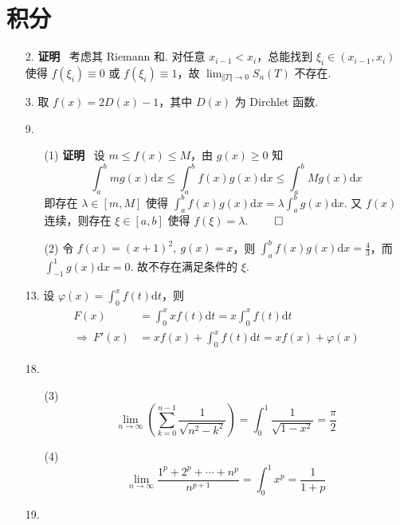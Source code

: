 \documentclass[11pt,oneside,fontset=fandol]{ctexbook} %
\renewcommand\theenumi{\thesection.\arabic{enumi}}
\begin{document}
\section{积分}
\label{sec:5.1}

\begin{enumerate}[label=\theenumi]
    \item[2.]
    \textbf{证明} \ 考虑其 Riemann 和. 对任意 $x_{i-1} < x_i$，总能找到 $\xi_i \in (x_{i-1}, x_i)$ 使得 $f(\xi_i) \equiv 0$ 或 $f(\xi_i) \equiv 1$，故 $\lim_{\Vert T \Vert \to 0} S_n(T)$ 不存在.
    \item[3.]
    取 $f(x) = 2D(x) - 1$，其中 $D(x)$ 为 Dirchlet 函数.
    \item[9.]
    \begin{enumerate}
        \item[(1)]
        \textbf{证明} \ 设 $m \leqslant f(x) \leqslant M$，由 $g(x) \geqslant 0$ 知
        \[
            \int_a^b m g(x) \mathrm dx \leqslant \int_a^b f(x)g(x) \mathrm dx \leqslant \int_a^b M g(x) \mathrm dx
        \]
        即存在 $\lambda \in [m, M]$ 使得 $\int_a^b f(x)g(x) \mathrm dx = \lambda \int_a^b g(x) \mathrm dx$. 又 $f(x)$ 连续，则存在 $\xi \in [a, b]$ 使得 $f(\xi) = \lambda$.
        $\hfill\qed$
        \item[(2)]
        令 $f(x) = (x+1)^2,\ g(x) = x$，则 $\int_a^b f(x)g(x) \mathrm dx = \frac 4 3$，而 $\int_{-1}^1 g(x) \mathrm dx = 0$. 故不存在满足条件的 $\xi$.
    \end{enumerate}
    \item[13.]
    设 $\varphi(x) = \int_0^x f(t) \mathrm dt$，则
    \begin{align*}
        F(x) &= \int_0^x x f(t) \mathrm dt = x \int_0^x f(t) \mathrm dt \\ 
        \Rightarrow \ F'(x) &= x f(x) + \int_0^x f(t) \mathrm dt = xf(x) + \varphi(x)
    \end{align*}
    \item[18.]
    \begin{enumerate}
        \item[(3)]
        \[
            \lim_{n \to \infty} \left( \sum_{k=0}^{n-1} \frac 1 {\sqrt{n^2 - k^2}} \right) = \int_0^1 \frac 1 {\sqrt{1 - x^2}} = \frac \pi 2
        \]
        \item[(4)]
        \[
            \lim_{n \to \infty} \frac{1^p + 2^p + \cdots + n^p}{n^{p+1}} = \int_0^1 x^p = \frac 1 {1+p}
        \]
    \end{enumerate}
    \item[19.]
    \begin{enumerate}

\end{enumerate}
\end{enumerate}
\end{document}
